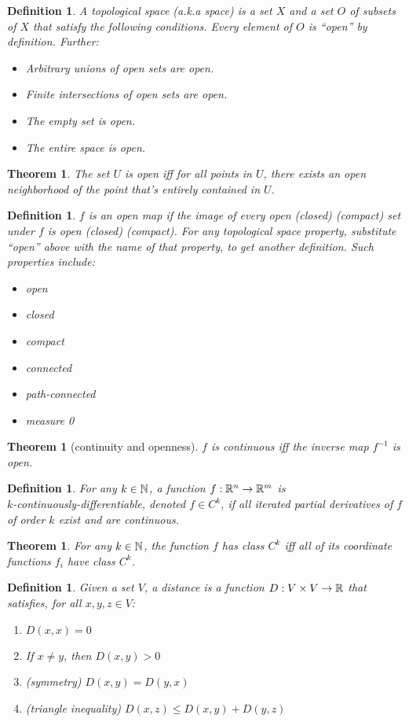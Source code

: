 \documentclass[11pt,leqno,oneside]{amsart}
\newcommand{\de}{\emph}
\theoremstyle{mystyle} \newtheorem{thrm}[thm]{Theorem}
\theoremstyle{mystyle} \newtheorem{defi}[thm]{Definition}
\begin{document}
\begin{defi}
	A \de{topological space} (a.k.a \de{space}) is a set $X$ and a set $O$ of subsets of $X$ that satisfy the following conditions.  Every element of $O$ is ``open'' by definition.  Further:
	\begin{itemize}
		\item Arbitrary unions of open sets are open.
		\item Finite intersections of open sets are open.
		\item The empty set is open.
		\item The entire space is open.
	\end{itemize}
\end{defi}
\begin{thrm}
	The set $U$ is open iff for all points in $U$, there exists an open neighborhood of the point that's entirely contained in $U$.
\end{thrm}
\begin{defi}
	$f$ is an \de{open} map if the image of every open (closed) (compact) set under $f$ is open (closed) (compact).
	For any topological space property, substitute ``open'' above with the name of that property, to get another definition.  Such properties include:
	\begin{itemize}
		\item open
		\item closed
		\item compact
		\item connected
		\item path-connected
		\item measure 0
	\end{itemize}
\end{defi}
\begin{thrm}[continuity and openness]
	$f$ is continuous iff the inverse map $f^{-1}$ is open.
\end{thrm}
\begin{defi}
	For any $k \in {\mathbb N}$, a function $f:{\mathbb R}^n \to {\mathbb R}^m$ is \\\de{$k$-continuously-differentiable}, denoted $f \in C^k$, if all iterated partial derivatives of $f$ of order $k$ exist and are continuous.
\end{defi}
\begin{thrm}
	For any $k \in {\mathbb N}$, the function $f$ has class $C^k$ iff all of its coordinate functions $f_i$ have class $C^k$.
\end{thrm}
\begin{defi}
	Given a set $V$, a \de{distance} is a function $D : V \times V \to {\mathbb R}$ that satisfies, for all $x, y, z \in V$:
	\begin{enumerate}
		\item $D(x,x) = 0$
		\item If $x \neq y$, then $D(x,y) > 0$
		\item (symmetry) $D(x,y) = D(y,x)$
		\item (triangle inequality) $D(x,z) \leq D(x,y) + D(y,z)$
	\end{enumerate}
\end{defi}
\end{document}
